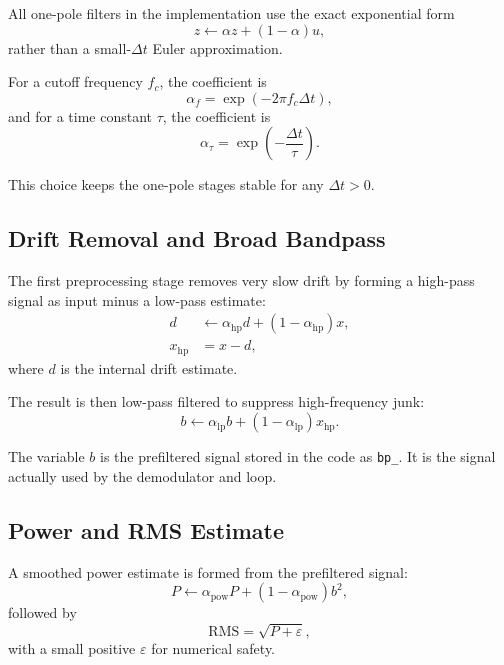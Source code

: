\documentclass[conference]{IEEEtran}
\begin{document}
    All one-pole filters in the implementation use the exact exponential form
    \begin{equation}
        z \leftarrow \alpha z + (1-\alpha)u,
    \end{equation}
    rather than a small-\(\Delta t\) Euler approximation.

    For a cutoff frequency \(f_c\), the coefficient is
    \begin{equation}
        \alpha_f = \exp(-2\pi f_c \Delta t),
    \end{equation}
    and for a time constant \(\tau\), the coefficient is
    \begin{equation}
        \alpha_\tau = \exp\!\left(-\frac{\Delta t}{\tau}\right).
    \end{equation}

    This choice keeps the one-pole stages stable for any \(\Delta t > 0\).

    \subsection{Drift Removal and Broad Bandpass}

    The first preprocessing stage removes very slow drift by forming a high-pass
    signal as input minus a low-pass estimate:
    \begin{align}
        d &\leftarrow \alpha_{\mathrm{hp}} d + (1-\alpha_{\mathrm{hp}})x,\\
        x_{\mathrm{hp}} &= x - d,
    \end{align}
    where \(d\) is the internal drift estimate.

    The result is then low-pass filtered to suppress high-frequency junk:
    \begin{equation}
        b \leftarrow \alpha_{\mathrm{lp}} b + (1-\alpha_{\mathrm{lp}})x_{\mathrm{hp}}.
    \end{equation}

    The variable \(b\) is the prefiltered signal stored in the code as
    \texttt{bp\_}. It is the signal actually used by the demodulator and loop.

    \subsection{Power and RMS Estimate}

    A smoothed power estimate is formed from the prefiltered signal:
    \begin{equation}
        P \leftarrow \alpha_{\mathrm{pow}} P + (1-\alpha_{\mathrm{pow}})b^2,
    \end{equation}
    followed by
    \begin{equation}
        \mathrm{RMS} = \sqrt{P + \varepsilon},
    \end{equation}
    with a small positive \(\varepsilon\) for numerical safety.
\end{document}
